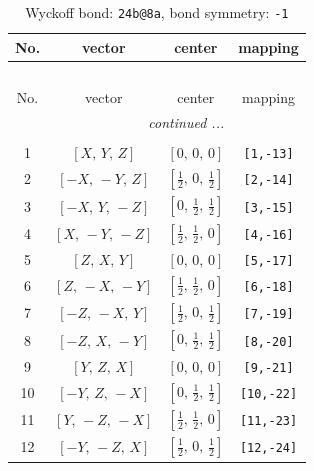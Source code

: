 \documentclass[fleqn,8pt]{jsarticle}
\begin{document}
\begin{longtable}{cccc}
\caption{Wyckoff bond: {\tt 24b@8a}, bond symmetry: {\tt -1}}
 \\
 \hline \hline
No. & vector & center & mapping \\ \hline \endfirsthead

\multicolumn{3}{l}{\tablename\ \thetable{}} \\
 \hline \hline
No. & vector & center & mapping \\ \hline \endhead

 \hline \hline
\multicolumn{3}{r}{\footnotesize\it continued ...} \\ \endfoot

 \hline \hline
\multicolumn{3}{r}{} \\ \endlastfoot

1 & $\left[ X,\, Y,\, Z \right]$ & $\left[ 0,\, 0,\, 0 \right]$ & {\tt [1,-13]} \\ \hline
2 & $\left[ - X,\, - Y,\, Z \right]$ & $\left[ \frac{1}{2},\, 0,\, \frac{1}{2} \right]$ & {\tt [2,-14]} \\ \hline
3 & $\left[ - X,\, Y,\, - Z \right]$ & $\left[ 0,\, \frac{1}{2},\, \frac{1}{2} \right]$ & {\tt [3,-15]} \\ \hline
4 & $\left[ X,\, - Y,\, - Z \right]$ & $\left[ \frac{1}{2},\, \frac{1}{2},\, 0 \right]$ & {\tt [4,-16]} \\ \hline
5 & $\left[ Z,\, X,\, Y \right]$ & $\left[ 0,\, 0,\, 0 \right]$ & {\tt [5,-17]} \\ \hline
6 & $\left[ Z,\, - X,\, - Y \right]$ & $\left[ \frac{1}{2},\, \frac{1}{2},\, 0 \right]$ & {\tt [6,-18]} \\ \hline
7 & $\left[ - Z,\, - X,\, Y \right]$ & $\left[ \frac{1}{2},\, 0,\, \frac{1}{2} \right]$ & {\tt [7,-19]} \\ \hline
8 & $\left[ - Z,\, X,\, - Y \right]$ & $\left[ 0,\, \frac{1}{2},\, \frac{1}{2} \right]$ & {\tt [8,-20]} \\ \hline
9 & $\left[ Y,\, Z,\, X \right]$ & $\left[ 0,\, 0,\, 0 \right]$ & {\tt [9,-21]} \\ \hline
10 & $\left[ - Y,\, Z,\, - X \right]$ & $\left[ 0,\, \frac{1}{2},\, \frac{1}{2} \right]$ & {\tt [10,-22]} \\ \hline
11 & $\left[ Y,\, - Z,\, - X \right]$ & $\left[ \frac{1}{2},\, \frac{1}{2},\, 0 \right]$ & {\tt [11,-23]} \\ \hline
12 & $\left[ - Y,\, - Z,\, X \right]$ & $\left[ \frac{1}{2},\, 0,\, \frac{1}{2} \right]$ & {\tt [12,-24]} \\
\end{longtable}
\end{document}
